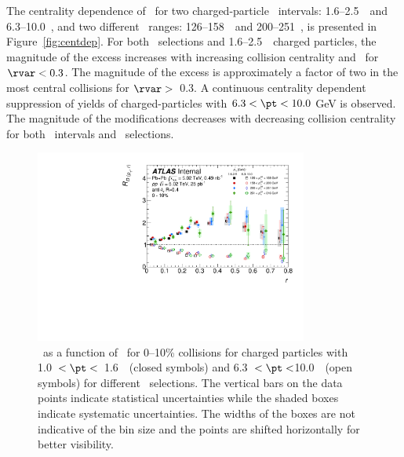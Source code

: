 The centrality dependence of \RDptr\ for two charged-particle \pt\ intervals: 1.6--2.5~\GeV\ and \mbox{6.3--10.0~\GeV}, and two different \ptjet\ ranges: 126--158~\GeV\ and 200--251~\GeV, is presented in Figure~\ref{fig:centdep}. 
For both \ptjet\ selections and  1.6--2.5~\GeV\ charged particles, the magnitude of the excess increases
with increasing collision centrality and \rvar\ for $\rvar < 0.3$.  The magnitude of the excess is
approximately a factor of two in the most central collisions for $\rvar >$~0.3.
A continuous centrality dependent suppression of  yields of charged-particles with $6.3 < \pt < 10.0$ GeV is observed.
The magnitude of the modifications decreases with decreasing collision centrality for both \pt\ 
intervals and \ptjet\ selections.

\begin{figure}[ht]
\centerline{
\includegraphics[width=0.8\textwidth]{figures/main/results/RDpT_dR_trk3_trk6_cent0.pdf} 
}
\caption{\RDptr\ as a function of \rvar\ for 0--10\% collisions for charged particles with 1.0~$< \pt <$~1.6~\GeV\
(closed symbols) and 6.3~$< \pt <$10.0~\GeV\ (open symbols) for different \ptjet\ selections. The vertical bars on the data points indicate statistical uncertainties while the shaded boxes indicate systematic uncertainties. The widths of the boxes are not indicative of the bin size and the points are shifted horizontally for better visibility.}
\label{fig:ptjetdep}
\end{figure}


